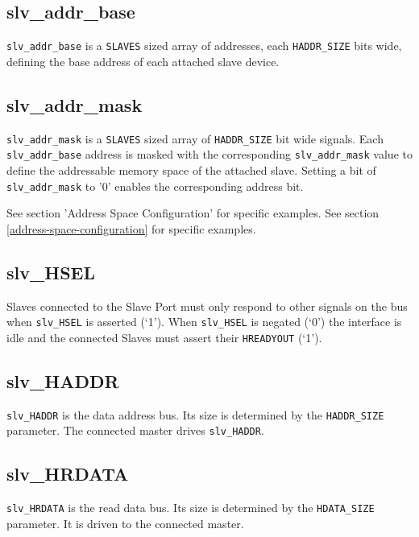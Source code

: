 \subsection{slv\_addr\_base}\label{slv_addr_base}

\texttt{slv\_addr\_base} is a \texttt{SLAVES} sized array of addresses, each
\texttt{HADDR\_SIZE} bits wide, defining the base address of each attached slave device.

\subsection{slv\_addr\_mask}\label{slv_addr_mask}
\texttt{slv\_addr\_mask} is a \texttt{SLAVES} sized array of \texttt{HADDR\_SIZE} bit wide
signals. Each \texttt{slv\_addr\_base} address is masked with the corresponding
\texttt{slv\_addr\_mask} value to define the addressable memory space of the attached slave.
Setting a bit of \texttt{slv\_addr\_mask} to '0' enables the corresponding address bit.

\ifdefined\MARKDOWN
  See section 'Address Space Configuration' for specific examples.
\else
  See section \ref{address-space-configuration} for specific examples.
\fi

\subsection{slv\_HSEL}\label{slv_hsel}

Slaves connected to the Slave Port must only respond to other signals on the bus when
\texttt{slv\_HSEL} is asserted (`1'). When \texttt{slv\_HSEL} is negated (`0') the
interface is idle and the connected Slaves must assert their \texttt{HREADYOUT} (`1').

\subsection{slv\_HADDR}\label{slv_haddr}

\texttt{slv\_HADDR} is the data address bus. Its size is determined by the
\texttt{HADDR\_SIZE} parameter. The connected master drives \texttt{slv\_HADDR}.

\subsection{slv\_HRDATA}\label{slv_hrdata}

\texttt{slv\_HRDATA} is the read data bus. Its size is determined by the
\texttt{HDATA\_SIZE} parameter. It is driven to the connected master.

